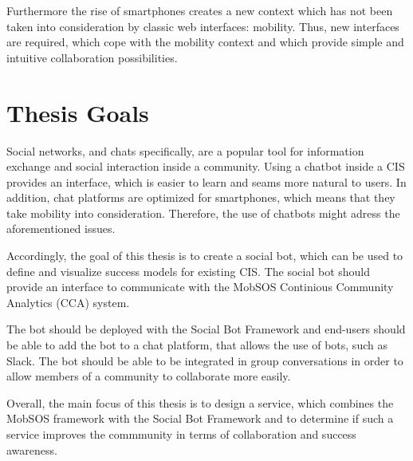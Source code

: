 Furthermore the rise of smartphones creates a new context which has not been taken into consideration by classic web interfaces: mobility.
Thus, new interfaces are required, which cope with the mobility context and which provide simple and intuitive collaboration possibilities.

\section{Thesis Goals}

Social networks, and chats specifically, are a popular tool for information exchange and social interaction inside a community.
Using a chatbot inside a CIS provides an interface, which is easier to learn and seams more natural to users.
In addition, chat platforms are optimized for smartphones, which means that they take mobility into consideration. Therefore, the use of chatbots might adress the aforementioned issues.

Accordingly, the goal of this thesis is to create a social bot, which can be used to define and visualize success models for existing CIS. The social bot should provide an interface to communicate with the MobSOS Continious Community Analytics (CCA) system.

The bot should be deployed with the Social Bot Framework and end-users should be able to add the bot to a chat platform, that allows the use of bots, such as Slack.
The bot should be able to be integrated in group conversations in order to allow members of a community to collaborate more easily.

Overall, the main focus of this thesis is to design a service, which combines the MobSOS framework with the Social Bot Framework and to determine if such a service improves the commmunity in terms of collaboration and success awareness.



